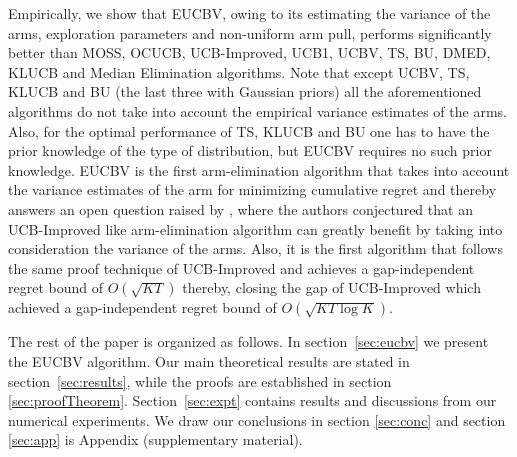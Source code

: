 Empirically, we show that EUCBV, owing to its estimating the variance of the arms, exploration parameters and non-uniform arm pull, performs significantly better than MOSS, OCUCB, UCB-Improved, UCB1, UCBV, TS, BU, DMED, KLUCB and Median Elimination algorithms. Note that except UCBV, TS, KLUCB and BU (the last three with Gaussian priors) all the aforementioned algorithms do not take into account the empirical variance estimates of the arms. Also, for the optimal performance of TS, KLUCB and BU one has to have the prior knowledge of the type of distribution, but EUCBV requires no such prior knowledge. EUCBV is the first arm-elimination algorithm that takes into account the variance estimates of the arm for minimizing cumulative regret and thereby answers an open question raised by \citet{auer2010ucb}, where the authors conjectured that an UCB-Improved like arm-elimination algorithm can greatly benefit by taking into consideration the variance of the arms. Also, it is the first algorithm that follows the same proof technique of UCB-Improved and achieves a gap-independent regret bound of $O\left( \sqrt{KT} \right)$ thereby, closing the gap of UCB-Improved which achieved a gap-independent regret bound of $O\left( \sqrt{KT\log K} \right)$. 
	
	The rest of the paper is organized as follows. In section~\ref{sec:eucbv} we present the  EUCBV algorithm. Our main theoretical results are stated in section~\ref{sec:results}, while the proofs are established in   section \ref{sec:proofTheorem}. Section~\ref{sec:expt} contains results and discussions from our numerical experiments. We draw our conclusions in section \ref{sec:conc} and section \ref{sec:app} is Appendix (supplementary material).
	
	
	
	
	